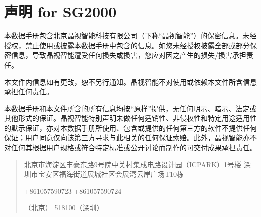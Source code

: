 \documentclass[letterpaper,10pt,english]{sphinxmanual}
\begin{document}
\sphinxstepscope


\chapter{声明 for SG2000}
\label{\detokenize{contents/disclaimer:for-sg2000}}\label{\detokenize{contents/disclaimer::doc}}
\begin{figure}[htbp]
\centering

\noindent{}
\end{figure}

\begin{DUlineblock}{0em}
\item[] 
\item[] 本数据手册包含北京晶视智能科技有限公司（下称“晶视智能”）的保密信息。未经授权，禁止使用或披露本数据手册中包含的信息。如您未经授权披露全部或部分保密信息，导致晶视智能遭受任何损失或损害，您应对因之产生的损失/损害承担责任。
\item[] 
\item[] 本文件内信息如有更改，恕不另行通知。晶视智能不对使用或依赖本文件所含信息承担任何责任。
\item[] 
\item[] 本数据手册和本文件所含的所有信息均按“原样”提供，无任何明示、暗示、法定或其他形式的保证。晶视智能特别声明未做任何适销性、非侵权性和特定用途适用性的默示保证，亦对本数据手册所使用、包含或提供的任何第三方的软件不提供任何保证；用户同意仅向该第三方寻求与此相关的任何保证索赔。此外，晶视智能亦不对任何其根据用户规格或符合特定标准或公开讨论而制作的可交付成果承担责任。
\end{DUlineblock}

\begin{DUlineblock}{0em}
\item[] 
\end{DUlineblock}
\begin{quote}\begin{description}
\sphinxAtStartPar
北京市海淀区丰豪东路9号院中关村集成电路设计园（ICPARK）1号楼  深圳市宝安区福海街道展城社区会展湾云岸广场T10栋

\sphinxAtStartPar
+86\sphinxhyphen{}10\sphinxhyphen{}57590723  +86\sphinxhyphen{}10\sphinxhyphen{}57590724

（北京） 518100（深圳）

\sphinxAtStartPar
{}

\sphinxAtStartPar
{}

\end{description}\end{quote}
\end{document}
